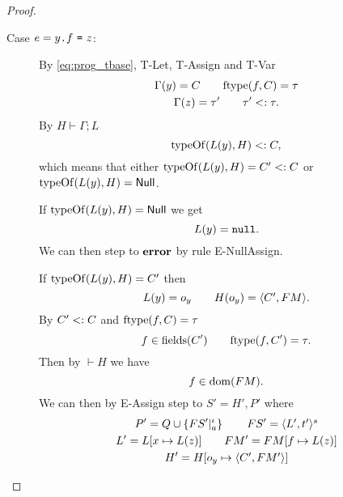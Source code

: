 \begin{proof}
\begin{description}
\begin{description}
        \item[Case $e = \mbox{\mdseries$y$\texttt{.}$f$~\texttt{=}~$z$}$:]
          By \eqref{eq:prog_tbase}, {\sc T-Let}, {\sc T-Assign} and {\sc T-Var}
          \begin{equation*}
            \begin{gathered}
              \Gamma(y) = C \quad\quad \mbox{$\mathrm{ftype}$}(f,C) = \tau  \\
              \Gamma(z) = \tau' \quad\quad \tau' <: \tau.
            \end{gathered}
          \end{equation*}
          By $H \vdash \Gamma;L$
          \begin{equation*}
            \mbox{$\mathrm{typeOf}$}(L(y), H) <: C,
          \end{equation*}
          which means that either $\mbox{$\mathrm{typeOf}$}(L(y), H) = C' <: C$ or \\
          $\mbox{$\mathrm{typeOf}$}(L(y), H) = \mbox{$\mathsf{Null}$}$.

          If $\mbox{$\mathrm{typeOf}$}(L(y), H) = \mbox{$\mathsf{Null}$}$ we get
          \begin{equation*}
            L(y) = \mbox{\mdseries\texttt{null}}.
          \end{equation*}
          We can then step to $\mbox{{\bf error}}$ by rule {\sc E-NullAssign}.
          \contradiction

          If $\mbox{$\mathrm{typeOf}$}(L(y), H) = C'$ then
          \begin{equation*}
            L(y) = o_y \quad\quad H(o_y) = \mbox{$\langle C', FM \rangle$}.
          \end{equation*}
          By $C' <: C$ and $\mbox{$\mathrm{ftype}$}(f, C) = \tau$
          \begin{equation*}
            f \in \mbox{$\mathrm{fields}$}(C') \quad\quad \mbox{$\mathrm{ftype}$}(f, C') = \tau.
          \end{equation*}
          Then by $\vdash H$ we have 
          \begin{equation*}
            f \in \mbox{$\mathrm{dom}$}(FM).
          \end{equation*}
          We can then by {\sc E-Assign} step to $S' = H', P'$ where
          \begin{equation*}
            \begin{gathered}
              P' = Q \cup \left\{FS'|_a^\iota \right\} \quad\quad FS' = \mbox{$\langle L',
              t' \rangle^s$} \\
              L' = L[x \mapsto L(z)] \quad\quad FM' = FM[f \mapsto L(z)] \\
              H' = H[o_y \mapsto \mbox{$\langle C', FM' \rangle$}]
            \end{gathered}
          \end{equation*}
          \contradiction


\end{description}
\end{description}
\end{proof}
